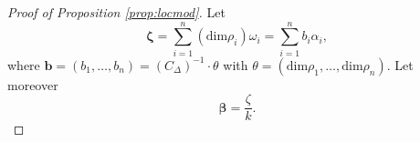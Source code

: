 \documentclass[11pt,a4paper]{amsart}
\theoremstyle{definition}
\begin{document}
\begin{proof}[{Proof of Proposition \ref{prop:locmod}}]
Let
\begin{equation}\mathbf{\zeta}= \sum_{i=1}^n (\mathrm{dim} \rho_i) \omega_i=\sum_{i=1}^n b_i \alpha_i, 
\label{eq:zetasub}
\end{equation}
where $\mathbf{b}=(b_1,\dots,b_n)=(C_\Delta)^{-1} \cdot \theta$ with $\theta=( \mathrm{dim} \rho_1 ,\dots, \mathrm{dim} \rho_n)$.
Let moreover 
\begin{equation}\mathbf{\beta}= \frac{\zeta}{k}. 
\label{eq:betasub}
\end{equation}


\end{proof}
\end{document}

